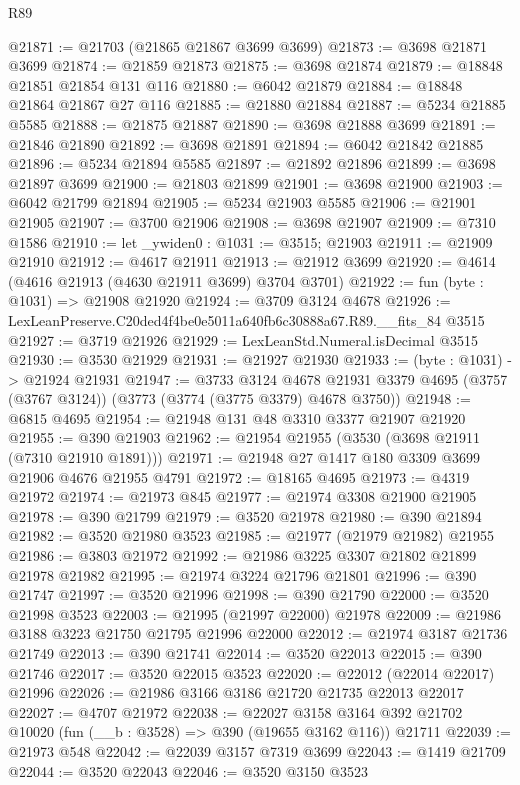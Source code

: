 \begin{lexlean}{R89}
\begin{coremodule}
@21871 := @21703 (@21865 @21867 @3699 @3699)
@21873 := @3698 @21871 @3699
@21874 := @21859 @21873
@21875 := @3698 @21874
@21879 := @18848 @21851 @21854 @131 @116
@21880 := @6042 @21879
@21884 := @18848 @21864 @21867 @27 @116
@21885 := @21880 @21884
@21887 := @5234 @21885 @5585
@21888 := @21875 @21887
@21890 := @3698 @21888 @3699
@21891 := @21846 @21890
@21892 := @3698 @21891
@21894 := @6042 @21842 @21885
@21896 := @5234 @21894 @5585
@21897 := @21892 @21896
@21899 := @3698 @21897 @3699
@21900 := @21803 @21899
@21901 := @3698 @21900
@21903 := @6042 @21799 @21894
@21905 := @5234 @21903 @5585
@21906 := @21901 @21905
@21907 := @3700 @21906
@21908 := @3698 @21907
@21909 := @7310 @1586
@21910 := let _ywiden0 : @1031 := @3515; @21903
@21911 := @21909 @21910
@21912 := @4617 @21911
@21913 := @21912 @3699
@21920 := @4614 (@4616 @21913 (@4630 @21911 @3699) @3704 @3701)
@21922 := fun (byte : @1031) => @21908 @21920
@21924 := @3709 @3124 @4678
@21926 := LexLeanPreserve.C20ded4f4be0e5011a640fb6c30888a67.R89.__fits_84 @3515
@21927 := @3719 @21926
@21929 := LexLeanStd.Numeral.isDecimal @3515
@21930 := @3530 @21929
@21931 := @21927 @21930
@21933 := (byte : @1031) -> @21924 @21931
@21947 := @3733
    @3124
    @4678
    @21931
    @3379
    @4695
    (@3757 (@3767 @3124))
    (@3773 (@3774 (@3775 @3379) @4678 @3750))
@21948 := @6815 @4695
@21954 := @21948 @131 @48 @3310 @3377 @21907 @21920
@21955 := @390 @21903
@21962 := @21954 @21955 (@3530 (@3698 @21911 (@7310 @21910 @1891)))
@21971 := @21948 @27 @1417 @180 @3309 @3699 @21906 @4676 @21955 @4791
@21972 := @18165 @4695
@21973 := @4319 @21972
@21974 := @21973 @845
@21977 := @21974 @3308 @21900 @21905
@21978 := @390 @21799
@21979 := @3520 @21978
@21980 := @390 @21894
@21982 := @3520 @21980 @3523
@21985 := @21977 (@21979 @21982) @21955
@21986 := @3803 @21972
@21992 := @21986 @3225 @3307 @21802 @21899 @21978 @21982
@21995 := @21974 @3224 @21796 @21801
@21996 := @390 @21747
@21997 := @3520 @21996
@21998 := @390 @21790
@22000 := @3520 @21998 @3523
@22003 := @21995 (@21997 @22000) @21978
@22009 := @21986 @3188 @3223 @21750 @21795 @21996 @22000
@22012 := @21974 @3187 @21736 @21749
@22013 := @390 @21741
@22014 := @3520 @22013
@22015 := @390 @21746
@22017 := @3520 @22015 @3523
@22020 := @22012 (@22014 @22017) @21996
@22026 := @21986 @3166 @3186 @21720 @21735 @22013 @22017
@22027 := @4707 @21972
@22038 := @22027
    @3158
    @3164
    @392
    @21702
    @10020
    (fun (__b : @3528) => @390 (@19655 @3162 @116))
    @21711
@22039 := @21973 @548
@22042 := @22039 @3157 @7319 @3699
@22043 := @1419 @21709
@22044 := @3520 @22043
@22046 := @3520 @3150 @3523

\end{coremodule}
\end{lexlean}
